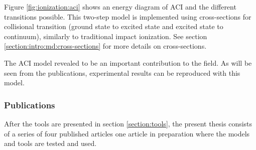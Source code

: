 

Figure \ref{fig:ionization:aci} shows an energy diagram of ACI and the
different transitions possible. This two-step model is implemented using
cross-sections for collisional transition (ground state to excited state and
excited state to continuum), similarly to traditional impact
ionization. See section \ref{section:intro:md:cross-sections} for more
details on cross-sections.

The ACI model revealed to be an important contribution to the field. As will be
seen from the publications, experimental results can be reproduced with this
model.



\subsubsection{Publications}

After the tools are presented in section \ref{section:tools}, the present thesis
consists of a series of %
four published articles
one article in preparation
where the models
and tools are tested and used.


